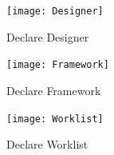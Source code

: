 \begin{figure}[H]
\begin{center}
  \texttt{[image: Designer]} %
  \caption{Declare Designer}
  \label{fig:Designer}
\end{center}
\end{figure} 


\begin{figure}[H]
\begin{center}
  \texttt{[image: Framework]} %
  \caption{Declare Framework}
  \label{fig:Framework}
\end{center}
\end{figure} 

\begin{figure}[H]
\begin{center}
  \texttt{[image: Worklist]} %
  \caption{Declare Worklist}
  \label{fig:Worklist}
\end{center}
\end{figure} 





